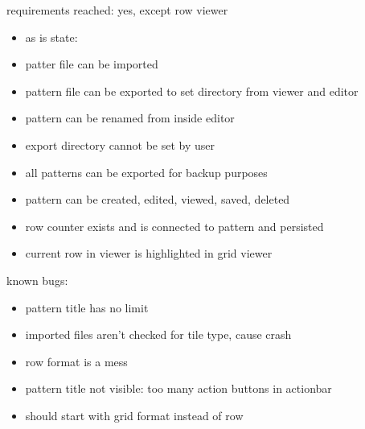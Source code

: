 requirements reached:
yes, except row viewer

\begin{itemize}
\item as is state:
\item patter file can be imported
\item pattern file can be exported to set directory from viewer and editor
\item pattern can be renamed from inside editor
\item export directory cannot be set by user
\item all patterns can be exported for backup purposes
\item pattern can be created, edited, viewed, saved, deleted
\item row counter exists and is connected to pattern and persisted
\item current row in viewer is highlighted in grid viewer
\end{itemize}

known bugs:
\begin{itemize}
\item pattern title has no limit
\item imported files aren't checked for tile type, cause crash
\item row format is a mess
\item pattern title not visible: too many action buttons in actionbar
\item should start with grid format instead of row
\end{itemize}

